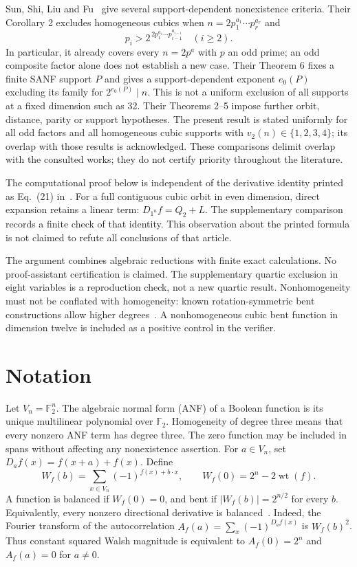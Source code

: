 \documentclass[11pt,a4paper]{article}
\newcommand{\F}{\mathbb F_2}
\newcommand{\wt}{\operatorname{wt}}
\begin{document}
Sun, Shi, Liu and Fu~\cite{sun} give several support-dependent nonexistence criteria. Their Corollary 2 excludes homogeneous cubics when $n=2p_1^{a_1}\cdots p_r^{a_r}$ and
\[
 p_i>2^{\,2p_1^{a_1}\cdots p_{i-1}^{a_{i-1}}}\quad (i\ge2).
\]
In particular, it already covers every $n=2p^a$ with $p$ an odd prime; an odd composite factor alone does not establish a new case. Their Theorem 6 fixes a finite SANF support $P$ and gives a support-dependent exponent $e_0(P)$ excluding its family for $2^{e_0(P)}\mid n$. This is not a uniform exclusion of all supports at a fixed dimension such as 32. Their Theorems 2--5 impose further orbit, distance, parity or support hypotheses. The present result is stated uniformly for all odd factors and all homogeneous cubic supports with $v_2(n)\in\{1,2,3,4\}$; its overlap with those results is acknowledged. These comparisons delimit overlap with the consulted works; they do not certify priority throughout the literature.

The computational proof below is independent of the derivative identity printed as Eq.~(21) in~\cite{sun}. For a full contiguous cubic orbit in even dimension, direct expansion retains a linear term: $D_{1^n}f=Q_2+L$. The supplementary comparison records a finite check of that identity. This observation about the printed formula is not claimed to refute all conclusions of that article.

The argument combines algebraic reductions with finite exact calculations. No proof-assistant certification is claimed. The supplementary quartic exclusion in eight variables is a reproduction check, not a new quartic result. Nonhomogeneity must not be conflated with homogeneity: known rotation-symmetric bent constructions allow higher degrees~\cite{sutang}. A nonhomogeneous cubic bent function in dimension twelve is included as a positive control in the verifier.

\section{Notation}
Let $V_n=\F^n$. The algebraic normal form (ANF) of a Boolean function is its unique multilinear polynomial over $\F$. Homogeneity of degree three means that every nonzero ANF term has degree three. The zero function may be included in spans without affecting any nonexistence assertion.
For $a\in V_n$, set $D_a f(x)=f(x+a)+f(x)$. Define
\[
 W_f(b)=\sum_{x\in V_n}(-1)^{f(x)+b\cdot x},\qquad
 W_f(0)=2^n-2\wt(f).
\]
A function is balanced if $W_f(0)=0$, and bent if $|W_f(b)|=2^{n/2}$ for every $b$. Equivalently, every nonzero directional derivative is balanced~\cite{rothaus}. Indeed, the Fourier transform of the autocorrelation $A_f(a)=\sum_x(-1)^{D_af(x)}$ is $W_f(b)^2$. Thus constant squared Walsh magnitude is equivalent to $A_f(0)=2^n$ and $A_f(a)=0$ for $a\ne0$.
\end{document}

